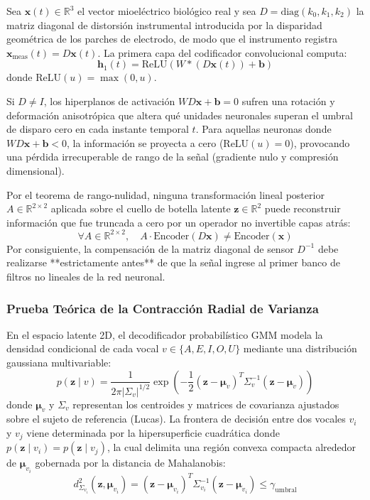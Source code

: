 \documentclass[11pt,a4paper]{article}
\begin{document}
Sea $\mathbf{x}(t) \in \mathbb{R}^3$ el vector mioeléctrico biológico real y sea $D = \text{diag}(k_0, k_1, k_2)$ la matriz diagonal de distorsión instrumental introducida por la disparidad geométrica de los parches de electrodo, de modo que el instrumento registra $\mathbf{x}_{\text{meas}}(t) = D \mathbf{x}(t)$. La primera capa del codificador convolucional computa:
\begin{equation}
\mathbf{h}_1(t) = \text{ReLU}\left( W * (D \mathbf{x}(t)) + \mathbf{b} \right)
\end{equation}
donde $\text{ReLU}(u) = \max(0, u)$. 

Si $D \ne I$, los hiperplanos de activación $W D \mathbf{x} + \mathbf{b} = 0$ sufren una rotación y deformación anisotrópica que altera qué unidades neuronales superan el umbral de disparo cero en cada instante temporal $t$. Para aquellas neuronas donde $W D \mathbf{x} + \mathbf{b} < 0$, la información se proyecta a cero ($\text{ReLU}(u) = 0$), provocando una pérdida irrecuperable de rango de la señal (gradiente nulo y compresión dimensional). 

Por el teorema de rango-nulidad, ninguna transformación lineal posterior $A \in \mathbb{R}^{2 \times 2}$ aplicada sobre el cuello de botella latente $\mathbf{z} \in \mathbb{R}^2$ puede reconstruir información que fue truncada a cero por un operador no invertible capas atrás:
\begin{equation}
\forall A \in \mathbb{R}^{2 \times 2}, \quad A \cdot \text{Encoder}(D \mathbf{x}) \ne \text{Encoder}(\mathbf{x})
\end{equation}
Por consiguiente, la compensación de la matriz diagonal de sensor $D^{-1}$ debe realizarse **estrictamente antes** de que la señal ingrese al primer banco de filtros no lineales de la red neuronal.

\subsubsection{Prueba Teórica de la Contracción Radial de Varianza}
En el espacio latente 2D, el decodificador probabilístico GMM modela la densidad condicional de cada vocal $v \in \{A, E, I, O, U\}$ mediante una distribución gaussiana multivariable:
\begin{equation}
p(\mathbf{z} \mid v) = \frac{1}{2\pi |\Sigma_v|^{1/2}} \exp\left( -\frac{1}{2} (\mathbf{z} - \boldsymbol{\mu}_v)^T \Sigma_v^{-1} (\mathbf{z} - \boldsymbol{\mu}_v) \right)
\end{equation}
donde $\boldsymbol{\mu}_v$ y $\Sigma_v$ representan los centroides y matrices de covarianza ajustados sobre el sujeto de referencia (Lucas). La frontera de decisión entre dos vocales $v_i$ y $v_j$ viene determinada por la hipersuperficie cuadrática donde $p(\mathbf{z} \mid v_i) = p(\mathbf{z} \mid v_j)$, la cual delimita una región convexa compacta alrededor de $\boldsymbol{\mu}_{v_i}$ gobernada por la distancia de Mahalanobis:
\begin{equation}
d_{\Sigma_{v_i}}^2(\mathbf{z}, \boldsymbol{\mu}_{v_i}) = (\mathbf{z} - \boldsymbol{\mu}_{v_i})^T \Sigma_{v_i}^{-1} (\mathbf{z} - \boldsymbol{\mu}_{v_i}) \le \gamma_{\text{umbral}}
\end{equation}
\end{document}

